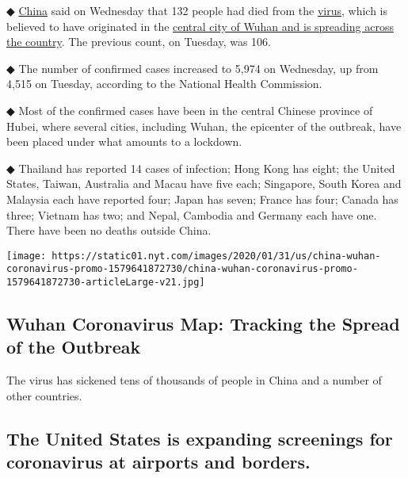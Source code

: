 ◆
\href{https://www.nytimes.com/2020/02/11/world/asia/coronavirus-indonesia-bali.html}{China}
said on Wednesday that 132 people had died from the
\href{https://www.nytimes.com/2020/02/11/world/asia/coronavirus-indonesia-bali.html}{virus},
which is believed to have originated in the
\href{https://www.nytimes.com/interactive/2020/world/asia/china-wuhan-coronavirus-maps.html}{central
city of Wuhan and is spreading across the country}. The previous count,
on Tuesday, was 106.

◆ The number of confirmed cases increased to 5,974 on Wednesday, up from
4,515 on Tuesday, according to the National Health Commission.

◆ Most of the confirmed cases have been in the central Chinese province
of Hubei, where several cities, including Wuhan, the epicenter of the
outbreak, have been placed under what amounts to a lockdown.

◆ Thailand has reported 14 cases of infection; Hong Kong has eight; the
United States, Taiwan, Australia and Macau have five each; Singapore,
South Korea and Malaysia each have reported four; Japan has seven;
France has four; Canada has three; Vietnam has two; and Nepal, Cambodia
and Germany each have one. There have been no deaths outside China.

\href{https://www.nytimes.com/interactive/2020/01/21/world/asia/china-coronavirus-maps.html}{}

\texttt{[image: https://static01.nyt.com/images/2020/01/31/us/china-wuhan-coronavirus-promo-1579641872730/china-wuhan-coronavirus-promo-1579641872730-articleLarge-v21.jpg]}

\hypertarget{wuhan-coronavirus-map-tracking-the-spread-of-the-outbreak}{%
\subsection{Wuhan Coronavirus Map: Tracking the Spread of the
Outbreak}\label{wuhan-coronavirus-map-tracking-the-spread-of-the-outbreak}}

The virus has sickened tens of thousands of people in China and a number
of other countries.

\hypertarget{the-united-states-is-expanding-screenings-for-coronavirus-at-airports-and-borders}{%
\subsection{The United States is expanding screenings for coronavirus at
airports and
borders.}\label{the-united-states-is-expanding-screenings-for-coronavirus-at-airports-and-borders}}

